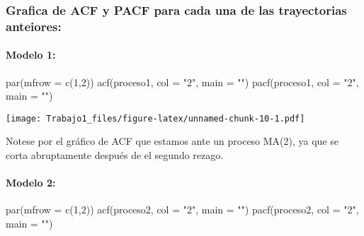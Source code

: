 \documentclass[
]{article}
\newenvironment{Shaded}{\begin{snugshade}}{\end{snugshade}}
\newcommand{\AttributeTok}[1]{\textcolor[rgb]{0.77,0.63,0.00}{#1}}
\newcommand{\DecValTok}[1]{\textcolor[rgb]{0.00,0.00,0.81}{#1}}
\newcommand{\FunctionTok}[1]{\textcolor[rgb]{0.00,0.00,0.00}{#1}}
\newcommand{\NormalTok}[1]{#1}
\newcommand{\StringTok}[1]{\textcolor[rgb]{0.31,0.60,0.02}{#1}}
\begin{document}
\hypertarget{grafica-de-acf-y-pacf-para-cada-una-de-las-trayectorias-anteiores}{%
\subsubsection{Grafica de ACF y PACF para cada una de las trayectorias
anteiores:}\label{grafica-de-acf-y-pacf-para-cada-una-de-las-trayectorias-anteiores}}

\hypertarget{modelo-1}{%
\paragraph{Modelo 1:}\label{modelo-1}}

\begin{Shaded}
\begin{Highlighting}[]
\FunctionTok{par}\NormalTok{(}\AttributeTok{mfrow =} \FunctionTok{c}\NormalTok{(}\DecValTok{1}\NormalTok{,}\DecValTok{2}\NormalTok{))}
\FunctionTok{acf}\NormalTok{(proceso1, }\AttributeTok{col =} \StringTok{"2"}\NormalTok{, }\AttributeTok{main =} \StringTok{""}\NormalTok{)}
\FunctionTok{pacf}\NormalTok{(proceso1, }\AttributeTok{col =} \StringTok{"2"}\NormalTok{, }\AttributeTok{main =} \StringTok{""}\NormalTok{)}
\end{Highlighting}
\end{Shaded}

\texttt{[image: Trabajo1\_files/figure-latex/unnamed-chunk-10-1.pdf]}

Notese por el gráfico de ACF que estamos ante un proceso MA(2), ya que
se corta abruptamente después de el segundo rezago.

\hypertarget{modelo-2}{%
\paragraph{Modelo 2:}\label{modelo-2}}

\begin{Shaded}
\begin{Highlighting}[]
\FunctionTok{par}\NormalTok{(}\AttributeTok{mfrow =} \FunctionTok{c}\NormalTok{(}\DecValTok{1}\NormalTok{,}\DecValTok{2}\NormalTok{))}
\FunctionTok{acf}\NormalTok{(proceso2, }\AttributeTok{col =} \StringTok{"2"}\NormalTok{, }\AttributeTok{main =} \StringTok{""}\NormalTok{)}
\FunctionTok{pacf}\NormalTok{(proceso2, }\AttributeTok{col =} \StringTok{"2"}\NormalTok{, }\AttributeTok{main =} \StringTok{""}\NormalTok{)}
\end{Highlighting}
\end{Shaded}
\end{document}
